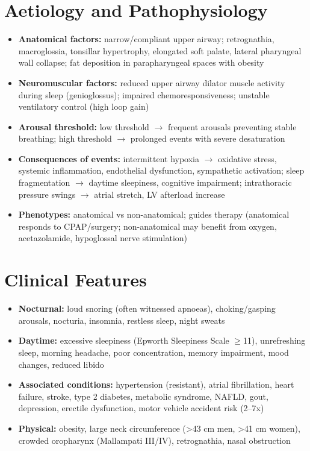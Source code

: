 \section*{Aetiology and Pathophysiology}
\begin{itemize}
    \item \textbf{Anatomical factors:} narrow/compliant upper airway; retrognathia, macroglossia, tonsillar hypertrophy, elongated soft palate, lateral pharyngeal wall collapse; fat deposition in parapharyngeal spaces with obesity
    \item \textbf{Neuromuscular factors:} reduced upper airway dilator muscle activity during sleep (genioglossus); impaired chemoresponsiveness; unstable ventilatory control (high loop gain)
    \item \textbf{Arousal threshold:} low threshold $\to$ frequent arousals preventing stable breathing; high threshold $\to$ prolonged events with severe desaturation
    \item \textbf{Consequences of events:} intermittent hypoxia $\to$ oxidative stress, systemic inflammation, endothelial dysfunction, sympathetic activation; sleep fragmentation $\to$ daytime sleepiness, cognitive impairment; intrathoracic pressure swings $\to$ atrial stretch, LV afterload increase
    \item \textbf{Phenotypes:} anatomical vs non-anatomical; guides therapy (anatomical responds to CPAP/surgery; non-anatomical may benefit from oxygen, acetazolamide, hypoglossal nerve stimulation)
\end{itemize}

\section*{Clinical Features}
\begin{itemize}
    \item \textbf{Nocturnal:} loud snoring (often witnessed apnoeas), choking/gasping arousals, nocturia, insomnia, restless sleep, night sweats
    \item \textbf{Daytime:} excessive sleepiness (Epworth Sleepiness Scale $\ge$11), unrefreshing sleep, morning headache, poor concentration, memory impairment, mood changes, reduced libido
    \item \textbf{Associated conditions:} hypertension (resistant), atrial fibrillation, heart failure, stroke, type 2 diabetes, metabolic syndrome, NAFLD, gout, depression, erectile dysfunction, motor vehicle accident risk (2--7x)
    \item \textbf{Physical:} obesity, large neck circumference (>43 cm men, >41 cm women), crowded oropharynx (Mallampati III/IV), retrognathia, nasal obstruction
\end{itemize}

